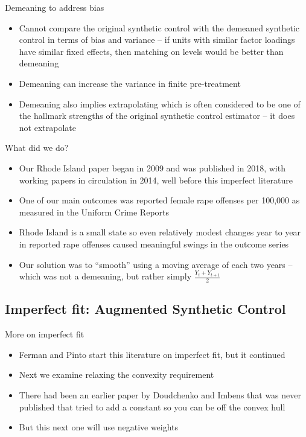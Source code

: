 \documentclass{beamer}
\begin{document}
\begin{frame}{Demeaning to address bias}

\begin{itemize}

\item Cannot compare the original synthetic control with the demeaned synthetic control in terms of bias and variance -- if units with similar factor loadings have similar fixed effects, then matching on levels would be better than demeaning 
\item Demeaning can increase the variance in finite pre-treatment
\item Demeaning also implies extrapolating which is often considered to be one of the hallmark strengths of the original synthetic control estimator -- it does not extrapolate 

\end{itemize}

\end{frame}

\begin{frame}{What did we do?}

\begin{itemize}
\item Our Rhode Island paper began in 2009 and was published in 2018, with working papers in circulation in 2014, well before this imperfect literature
\item One of our main outcomes was reported female rape offenses per 100,000 as measured in the Uniform Crime Reports 
\item Rhode Island is a small state so even relatively modest changes year to year in reported rape offenses caused meaningful swings in the outcome series
\item Our solution was to ``smooth'' using a moving average of each two years -- which was not a demeaning, but rather simply $\frac{Y_t + Y_{t+1}}{2}$
\end{itemize}

\end{frame}





\subsection{Imperfect fit: Augmented Synthetic Control}

\begin{frame}{More on imperfect fit}

\begin{itemize}
\item Ferman and Pinto start this literature on imperfect fit, but it continued
\item Next we examine relaxing the convexity requirement
\item There had been an earlier paper by Doudchenko and Imbens that was never published that tried to add a constant so you can be off the convex hull
\item But this next one will use negative weights
\end{itemize}

\end{frame}
\end{document}

